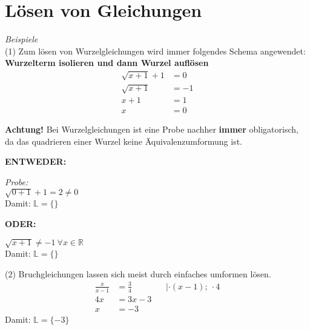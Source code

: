 \section{Lösen von Gleichungen}

\textit{Beispiele}\\
(1) Zum lösen von Wurzelgleichungen wird immer folgendes Schema angewendet: \\ \textbf{Wurzelterm isolieren und dann Wurzel auflösen}
\begin{align*}
    \sqrt{x + 1} +1 &= 0 \\
    \sqrt{x + 1} & = -1 \\
    x + 1 &= 1 \\
    x &= 0 
\end{align*}

\textbf{Achtung!} Bei Wurzelgleichungen ist eine Probe nachher \textbf{immer} obligatorisch, da das quadrieren einer Wurzel keine Äquivalenzumformung ist.

\textbf{ENTWEDER: }

\textit{Probe:}\\
$\sqrt{0 + 1} + 1 = 2 \neq 0$ \\
Damit: $\mathbb{L} = \{\}$

\textbf{ODER:}

$\sqrt{x + 1} \neq -1 \ \forall x \in \mathbb{R}$ \\
Damit: $\mathbb{L} = \{\}$

(2) Bruchgleichungen lassen sich meist durch einfaches umformen lösen.
\begin{align*}
    \frac{x}{x - 1} &= \frac{3}{4} \qquad  \qquad |\cdot (x - 1); \ \cdot 4  \\
    4x &= 3x - 3 \\
    x &= -3
\end{align*}
Damit: $\mathbb{L} = \{-3\}$

\newpage 

